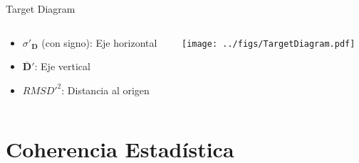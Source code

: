 \documentclass[aspectratio=169, usenames,svgnames,dvipsnames]{beamer}
\begin{document}
\begin{frame}[label={sec:orgde620d3}]{Target Diagram}
\begin{columns}
\begin{column}{0.4\columnwidth}
\begin{itemize}
\item \(\sigma'_{\mathbf{D}}\) (con signo): Eje horizontal
\item \(\overline{\mathbf{D}}'\): Eje vertical
\item \(RMSD'^2\): Distancia al origen
\end{itemize}
\end{column}

\begin{column}{0.6\columnwidth}
\begin{center}
\texttt{[image: ../figs/TargetDiagram.pdf]}
\end{center}
\end{column}
\end{columns}
\end{frame}


\section{Coherencia Estadística}
\label{sec:org0964a6c}
\end{document}
